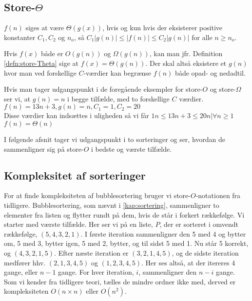 \subsection{Store-$\Theta$}
\begin{defn} \label{defn:store-Theta}
$f(n)$ siges at være $\Theta(g(x))$, hvis og kun hvis der eksisterer positive konstanter $C_1, C_2$ og $n_o$, så $C_1|g(n)| \leq |f(n)| \leq C_2|g(n)|$ for alle $n \geq n_o$.
\end{defn}
Hvis $f(x)$ både er $O(g(n))$ og $\Omega(g(n))$, kan man jfr. Definition \ref{defn:store-Theta} sige at $f(x) = \Theta(g(n))$. 
Der skal altså eksistere et $g(n)$ hvor man ved forskellige $C$-værdier kan begrænse $f(n)$ både opad- og nedadtil. 
\begin{exmp}
Hvis man tager udgangspunkt i de foregående eksempler for store-$O$ og store-$\Omega$ ser vi, at $g(n) = n$ i begge tilfælde, med to forskellige $C$ værdier. \\
$f(n)=13n+3, g(n)=n, C_1=1, C_2=20$ \\
Disse værdier kan indsættes i uligheden så vi får $1n \leq 13n+3 \leq 20n| \forall n \geq 1$ \\
$f(n)= \Theta(n)$
\end{exmp}

I følgende afsnit tager vi udgangspunkt i to sorteringer og ser, hvordan de sammenligner sig på store-$O$ i bedste og værste tilfælde.

\subsection{Kompleksitet af sorteringer} \label{kap:kompleksitet_sortering}

For at finde kompleksiteten af bubblesortering bruger vi store-$O$-notationen fra tidligere. 
Bubblesortering, som nævnt i \autoref{kap:sortering}, sammenligner to elementer fra listen og flytter rundt på dem, hvis de står i forkert rækkefølge.
Vi starter med værste tilfælde. Her ser vi på en liste, $P$, der er sorteret i omvendt rækkefølge, $(5,4,3,2,1)$.
I første iteration sammenligner den 5 med 4 og bytter om, 5 med 3, bytter igen, 5 med 2, bytter, og til sidst 5 med 1. Nu står 5 korrekt, og $(4, 3, 2, 1, 5)$.
Efter næste iteration er $(3, 2, 1, 4, 5)$, og de sidste iteration medfører hhv. $(2, 1, 3, 4, 5)$ og $(1, 2, 3, 4, 5)$. Her ses altså, at der itereres 4 gange, eller $n-1$ gange. 
For hver iteration, $i$, sammenligner den $n-i$ gange. 
Som vi kender fra tidligere teori, tælles de mindre ordner ikke med, derved er kompleksiteten $O(n\times n)$ eller $O(n^2)$.


